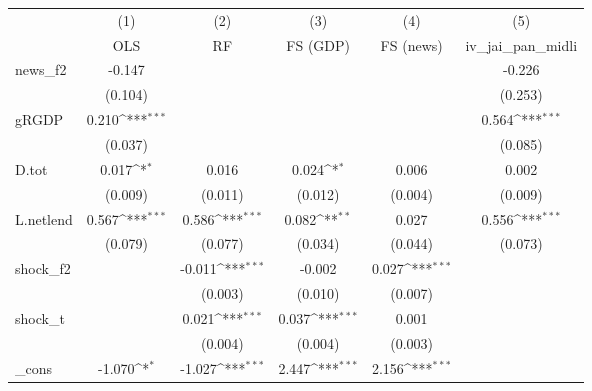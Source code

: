 {
\def\sym#1{\ifmmode^{#1}\else\(^{#1}\)\fi}
\begin{tabular}{l*{5}{c}}
\toprule
            &\multicolumn{1}{c}{(1)}&\multicolumn{1}{c}{(2)}&\multicolumn{1}{c}{(3)}&\multicolumn{1}{c}{(4)}&\multicolumn{1}{c}{(5)}\\
            &\multicolumn{1}{c}{OLS}&\multicolumn{1}{c}{RF}&\multicolumn{1}{c}{FS (GDP)}&\multicolumn{1}{c}{FS (news)}&\multicolumn{1}{c}{iv\_jai\_pan\_midli}\\
\midrule
news\_f2     &      -0.147         &                     &                     &                     &      -0.226         \\
            &     (0.104)         &                     &                     &                     &     (0.253)         \\
\addlinespace
gRGDP       &       0.210\sym{***}&                     &                     &                     &       0.564\sym{***}\\
            &     (0.037)         &                     &                     &                     &     (0.085)         \\
\addlinespace
D.tot       &       0.017\sym{*}  &       0.016         &       0.024\sym{*}  &       0.006         &       0.002         \\
            &     (0.009)         &     (0.011)         &     (0.012)         &     (0.004)         &     (0.009)         \\
\addlinespace
L.netlend   &       0.567\sym{***}&       0.586\sym{***}&       0.082\sym{**} &       0.027         &       0.556\sym{***}\\
            &     (0.079)         &     (0.077)         &     (0.034)         &     (0.044)         &     (0.073)         \\
\addlinespace
shock\_f2    &                     &      -0.011\sym{***}&      -0.002         &       0.027\sym{***}&                     \\
            &                     &     (0.003)         &     (0.010)         &     (0.007)         &                     \\
\addlinespace
shock\_t     &                     &       0.021\sym{***}&       0.037\sym{***}&       0.001         &                     \\
            &                     &     (0.004)         &     (0.004)         &     (0.003)         &                     \\
\addlinespace
\_cons      &      -1.070\sym{*}  &      -1.027\sym{***}&       2.447\sym{***}&       2.156\sym{***}&                     \\

\end{tabular}}
